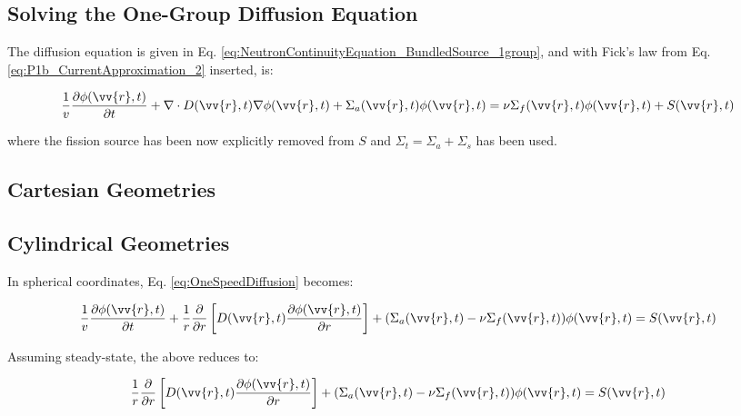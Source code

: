 \documentclass[10pt]{article}
\begin{document}
\begin{flushleft}
\clearpage




\section{Solving the One-Group Diffusion Equation}

The diffusion equation is given in Eq. \eqref{eq:NeutronContinuityEquation_BundledSource_1group}, and with Fick's law from Eq. \eqref{eq:P1b_CurrentApproximation_2} inserted, is:

\begin{equation}
\label{eq:OneSpeedDiffusion}
\frac{1}{v} \frac{\partial\phi(\vv{r}, t)}{\partial t} +\nabla\cdot D(\vv{r}, t)\nabla\phi(\vv{r},t) + \Sigma_a(\vv{r},t)\phi(\vv{r}, t) = \nu\Sigma_f(\vv{r},t)\phi(\vv{r},t)+ S(\vv{r}, t)
\end{equation}

where the fission source has been now explicitly removed from \(S\) and \(\Sigma_t=\Sigma_a+\Sigma_s\) has been used. 

\subsection{Cartesian Geometries}

\subsection{Cylindrical Geometries}

In spherical coordinates, Eq. \eqref{eq:OneSpeedDiffusion} becomes:

\begin{equation}
\label{eq:OneSpeedDiffusionCylindrical}
\frac{1}{v} \frac{\partial\phi(\vv{r}, t)}{\partial t} +\frac{1}{r}\frac{\partial}{\partial r}\left\lbrack D(\vv{r},t)\frac{\partial\phi(\vv{r},t)}{\partial r}\right\rbrack + (\Sigma_a(\vv{r},t)-\nu\Sigma_f(\vv{r},t))\phi(\vv{r}, t) = S(\vv{r}, t)
\end{equation}

Assuming steady-state, the above reduces to:

\begin{equation}
\label{eq:OneSpeedDiffusionCylindrical2}
\frac{1}{r}\frac{\partial}{\partial r}\left\lbrack D(\vv{r},t)\frac{\partial\phi(\vv{r},t)}{\partial r}\right\rbrack + (\Sigma_a(\vv{r},t)-\nu\Sigma_f(\vv{r},t))\phi(\vv{r}, t) = S(\vv{r}, t)
\end{equation}


\end{flushleft}
\end{document}
